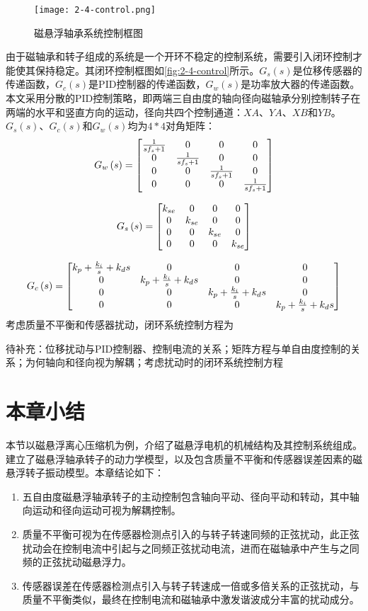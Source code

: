 \begin{figure}
	\texttt{[image: 2-4-control.png]}
	\caption{磁悬浮轴承系统控制框图}
	\label{fig:2-4-control}
\end{figure}
由于磁轴承和转子组成的系统是一个开环不稳定的控制系统，需要引入闭环控制才能使其保持稳定。其闭环控制框图如\autoref{fig:2-4-control}所示。$G_s(s)$是位移传感器的传递函数，$G_c(s)$是PID控制器的传递函数，$G_w(s)$是功率放大器的传递函数。本文采用分散的PID控制策略，即两端三自由度的轴向径向磁轴承分别控制转子在两端的水平和竖直方向的运动，径向共四个控制通道：$XA$、$YA$、$XB$和$YB$。$G_s(s)$、$G_c(s)$和$G_w(s)$均为$4*4$对角矩阵：
$${G_w}\left( s \right) = \left[ 
{\begin{matrix}
   {{1 \over {s{f_s} + 1}}} & 0 & 0 & 0  \cr 
   0 & {{1 \over {s{f_s} + 1}}} & 0 & 0  \cr 
   0 & 0 & {{1 \over {s{f_s} + 1}}} & 0  \cr 
   0 & 0 & 0 & {{1 \over {s{f_s} + 1}}}  \cr 

 \end{matrix} }
\right]$$

$${G_s}\left( s \right) = \left[ 
{\begin{matrix}
   {{k_{se}}} & 0 & 0 & 0  \cr 
   0 & {{k_{se}}} & 0 & 0  \cr 
   0 & 0 & {{k_{se}}} & 0  \cr 
   0 & 0 & 0 & {{k_{se}}}  \cr 

 \end{matrix} } 
 \right]$$
 
$${G_c}\left( s \right) = \left[ {\begin{matrix}
   {{k_p} + {{{k_i}} \over s} + {k_d}s} & 0 & 0 & 0  \cr 
   0 & {{k_p} + {{{k_i}} \over s} + {k_d}s} & 0 & 0  \cr 
   0 & 0 & {{k_p} + {{{k_i}} \over s} + {k_d}s} & 0  \cr 
   0 & 0 & 0 & {{k_p} + {{{k_i}} \over s} + {k_d}s}  \cr 

 \end{matrix} } \right]$$
考虑质量不平衡和传感器扰动，闭环系统控制方程为

待补充：位移扰动与PID控制器、控制电流的关系；矩阵方程与单自由度控制的关系；为何轴向和径向视为解耦；考虑扰动时的闭环系统控制方程

\section{本章小结}
本节以磁悬浮离心压缩机为例，介绍了磁悬浮电机的机械结构及其控制系统组成。建立了磁悬浮轴承转子的动力学模型，以及包含质量不平衡和传感器误差因素的磁悬浮转子振动模型。本章结论如下：
\begin{enumerate}
\item 五自由度磁悬浮轴承转子的主动控制包含轴向平动、径向平动和转动，其中轴向运动和径向运动可视为解耦控制。
\item 质量不平衡可视为在传感器检测点引入的与转子转速同频的正弦扰动，此正弦扰动会在控制电流中引起与之同频正弦扰动电流，进而在磁轴承中产生与之同频的正弦扰动磁悬浮力。
\item 传感器误差在传感器检测点引入与转子转速成一倍或多倍关系的正弦扰动，与质量不平衡类似，最终在控制电流和磁轴承中激发谐波成分丰富的扰动成分。
\end{enumerate}
